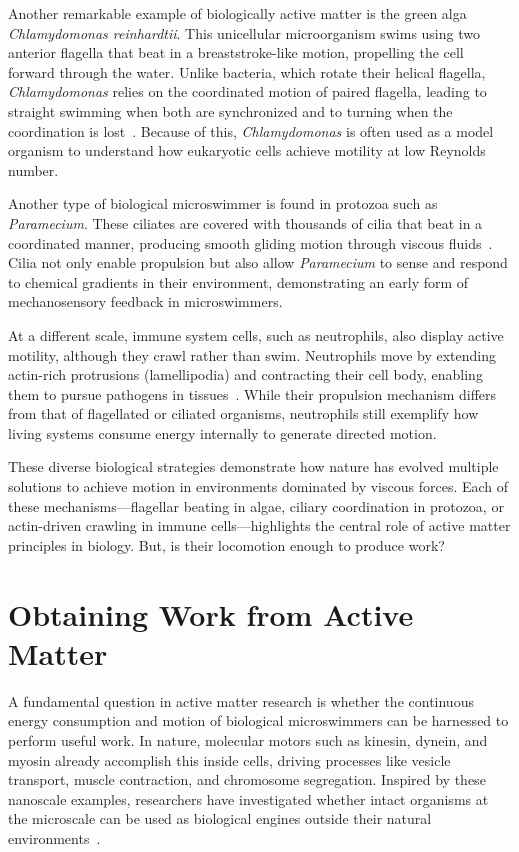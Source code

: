 Another remarkable example of biologically active matter is the green alga \textit{Chlamydomonas reinhardtii}. This unicellular microorganism swims using two anterior flagella that beat in a breaststroke-like motion, propelling the cell forward through the water. Unlike bacteria, which rotate their helical flagella, \textit{Chlamydomonas} relies on the coordinated motion of paired flagella, leading to straight swimming when both are synchronized and to turning when the coordination is lost~\cite{goldstein2015green}. Because of this, \textit{Chlamydomonas} is often used as a model organism to understand how eukaryotic cells achieve motility at low Reynolds number.

Another type of biological microswimmer is found in protozoa such as \textit{Paramecium}. These ciliates are covered with thousands of cilia that beat in a coordinated manner, producing smooth gliding motion through viscous fluids~\cite{zhang2015paramecia}. Cilia not only enable propulsion but also allow \textit{Paramecium} to sense and respond to chemical gradients in their environment, demonstrating an early form of mechanosensory feedback in microswimmers.

At a different scale, immune system cells, such as neutrophils, also display active motility, although they crawl rather than swim. Neutrophils move by extending actin-rich protrusions (lamellipodia) and contracting their cell body, enabling them to pursue pathogens in tissues~\cite{friedl2004collective}. While their propulsion mechanism differs from that of flagellated or ciliated organisms, neutrophils still exemplify how living systems consume energy internally to generate directed motion.

These diverse biological strategies demonstrate how nature has evolved multiple solutions to achieve motion in environments dominated by viscous forces. Each of these mechanisms—flagellar beating in algae, ciliary coordination in protozoa, or actin-driven crawling in immune cells—highlights the central role of active matter principles in biology. But, is their locomotion enough to produce work?

\section{Obtaining Work from Active Matter}

A fundamental question in active matter research is whether the continuous energy consumption and motion of biological microswimmers can be harnessed to perform useful work. In nature, molecular motors such as kinesin, dynein, and myosin already accomplish this inside cells, driving processes like vesicle transport, muscle contraction, and chromosome segregation. Inspired by these nanoscale examples, researchers have investigated whether intact organisms at the microscale can be used as biological engines outside their natural environments~\cite{schliwa2003molecular}.

